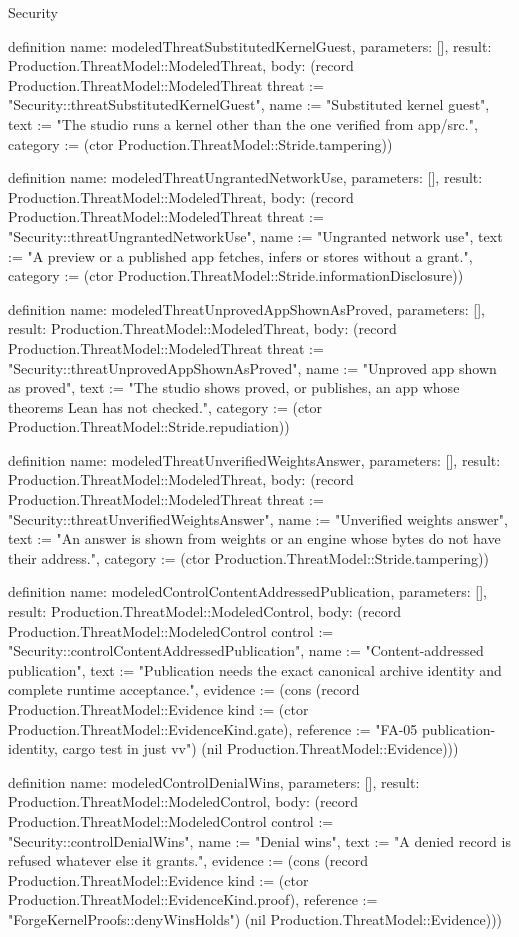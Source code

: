 \begin{lexlean}{Security}
\begin{semanticmodule}
definition{
  name: modeledThreatSubstitutedKernelGuest,
  parameters: [],
  result: Production.ThreatModel::ModeledThreat,
  body: (record Production.ThreatModel::ModeledThreat {threat := "Security::threatSubstitutedKernelGuest", name := "Substituted kernel guest", text := "The studio runs a kernel other than the one verified from app/src.", category := (ctor Production.ThreatModel::Stride.tampering)})
}

definition{
  name: modeledThreatUngrantedNetworkUse,
  parameters: [],
  result: Production.ThreatModel::ModeledThreat,
  body: (record Production.ThreatModel::ModeledThreat {threat := "Security::threatUngrantedNetworkUse", name := "Ungranted network use", text := "A preview or a published app fetches, infers or stores without a grant.", category := (ctor Production.ThreatModel::Stride.informationDisclosure)})
}

definition{
  name: modeledThreatUnprovedAppShownAsProved,
  parameters: [],
  result: Production.ThreatModel::ModeledThreat,
  body: (record Production.ThreatModel::ModeledThreat {threat := "Security::threatUnprovedAppShownAsProved", name := "Unproved app shown as proved", text := "The studio shows proved, or publishes, an app whose theorems Lean has not checked.", category := (ctor Production.ThreatModel::Stride.repudiation)})
}

definition{
  name: modeledThreatUnverifiedWeightsAnswer,
  parameters: [],
  result: Production.ThreatModel::ModeledThreat,
  body: (record Production.ThreatModel::ModeledThreat {threat := "Security::threatUnverifiedWeightsAnswer", name := "Unverified weights answer", text := "An answer is shown from weights or an engine whose bytes do not have their address.", category := (ctor Production.ThreatModel::Stride.tampering)})
}

definition{
  name: modeledControlContentAddressedPublication,
  parameters: [],
  result: Production.ThreatModel::ModeledControl,
  body: (record Production.ThreatModel::ModeledControl {control := "Security::controlContentAddressedPublication", name := "Content-addressed publication", text := "Publication needs the exact canonical archive identity and complete runtime acceptance.", evidence := (cons (record Production.ThreatModel::Evidence {kind := (ctor Production.ThreatModel::EvidenceKind.gate), reference := "FA-05 publication-identity, cargo test in just vv"}) (nil Production.ThreatModel::Evidence))})
}

definition{
  name: modeledControlDenialWins,
  parameters: [],
  result: Production.ThreatModel::ModeledControl,
  body: (record Production.ThreatModel::ModeledControl {control := "Security::controlDenialWins", name := "Denial wins", text := "A denied record is refused whatever else it grants.", evidence := (cons (record Production.ThreatModel::Evidence {kind := (ctor Production.ThreatModel::EvidenceKind.proof), reference := "ForgeKernelProofs::denyWinsHolds"}) (nil Production.ThreatModel::Evidence))})
}


\end{semanticmodule}
\end{lexlean}
